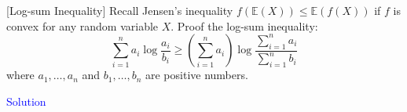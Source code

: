 \item {} [Log-sum Inequality] Recall Jensen's inequality $f(\mathbb{E}(X)) \leq \mathbb{E}(f(X))$ if $f$ is convex for any random variable $X$. Proof the log-sum inequality:
$$ \sum_{i=1}^{n} a_i \log \frac{a_i}{b_i} \geq \left( \sum_{i=1}^{n} a_i\right) \log \frac{\sum_{i=1}^{n} a_i}{\sum_{i=1}^{n} b_i} $$
where $a_1,\ldots,a_n$ and $b_1,\ldots,b_n$ are positive numbers.

\textcolor{blue}{Solution} \\






\newpage